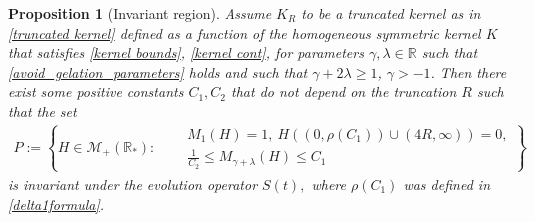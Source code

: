 \documentclass[11pt]{article}
\numberwithin{equation}{section}
\theoremstyle{plain}
\newtheorem{proposition}[theorem]{Proposition}
\begin{document}
\begin{proposition}[Invariant region] \label{prop:inv region}
Assume $K_R $ to be a truncated kernel as in \eqref{truncated kernel} defined as a function of the homogeneous symmetric kernel $K$ that satisfies \eqref{kernel bounds},  \eqref{kernel cont},  for parameters $\gamma, \lambda \in \mathbb R$ such that \eqref{avoid_gelation_parameters} holds and such that $\gamma + 2\lambda \geq  1$, $\gamma >-1 $. Then there exist some positive constants $C_1, C_2$ that do not depend on the truncation $R$ such that the set
\begin{align} \label{invariant region}
P:=\left\{ 
H \in \mathcal M_{+}(\mathbb R_*) : \quad \begin{aligned}   & M_1(H )=1,\ 
H((0, \rho(C_1)) \cup (4R,\infty) )=0, \\
& \frac{1}{C_{2}} \leq M_{\gamma + \lambda}(H) \leq C_1
 \end{aligned} 
 \right\}
\end{align} 
is invariant under the evolution operator $S(t),$ where $\rho(C_1)$ was defined in \eqref{delta1formula}. 
\end{proposition}
\end{document}
